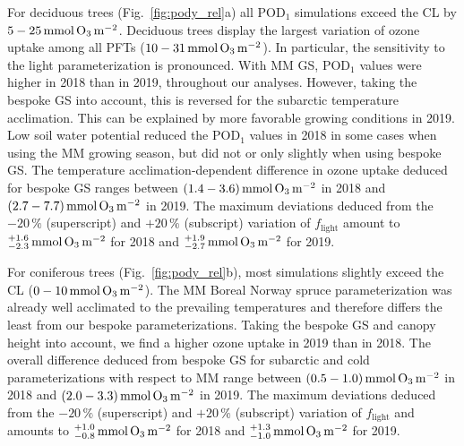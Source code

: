 \documentclass[bg, manuscript]{copernicus}
\begin{document}
For deciduous trees (Fig.~\ref{fig:pody_rel}a) all $\mathrm{POD_1}$ simulations exceed the CL by $5-25\,\unit{mmol\,\chem{O_3}\,m^{-2}}$. Deciduous trees display the largest variation of ozone uptake among all PFTs ($10-31\,\unit{mmol\,\chem{O_3}\,m^{-2}}$). In particular, the sensitivity to the light parameterization is pronounced. With MM GS, $\mathrm{POD_1}$ values were higher in 2018 than in 2019, throughout our analyses. However, taking the bespoke GS into account, this is reversed for the subarctic temperature acclimation. This can be explained by more favorable growing conditions in 2019. Low soil water potential reduced the $\mathrm{POD_1}$ values in 2018 in some cases when using the MM growing season, but did not or only slightly when using bespoke GS. The temperature acclimation-dependent difference in ozone uptake deduced for bespoke GS ranges between $(1.4-3.6)\,\unit{mmol\,\chem{O_3}\,m^{-2}}$ in 2018 and $(2.7-7.7)\,\unit{mmol\,\chem{O_3}\,m^{-2}}$ in 2019. The maximum deviations deduced from the $-20\,\unit{\%}$ (superscript) and $+20\,\unit{\%}$ (subscript) variation of $f_\mathrm{light}$ amount to $^{+1.6}_{-2.3}\,\unit{mmol\,\chem{O_3}\,m^{-2}}$ for 2018 and $^{+1.9}_{-2.7}\,\unit{mmol\,\chem{O_3}\,m^{-2}}$ for 2019. 

For coniferous trees (Fig.~\ref{fig:pody_rel}b), most simulations slightly exceed the CL ($0-10\,\unit{mmol\,\chem{O_3}\,m^{-2}}$). The MM Boreal Norway spruce parameterization was already well acclimated to the prevailing temperatures and therefore differs the least from our bespoke parameterizations. Taking the bespoke GS and canopy height into account, we find a higher ozone uptake in 2019 than in 2018. The overall difference deduced from bespoke GS for subarctic and cold parameterizations with respect to MM range between $(0.5-1.0)\,\unit{mmol\,\chem{O_3}\,m^{-2}}$ in 2018 and $(2.0-3.3)\,\unit{mmol\,\chem{O_3}\,m^{-2}}$ in 2019. The maximum deviations deduced from the $-20\,\unit{\%}$ (superscript) and $+20\,\unit{\%}$ (subscript) variation of $f_\mathrm{light}$ and amounts to $^{+1.0}_{-0.8}\,\unit{mmol\,\chem{O_3}\,m^{-2}}$ for 2018 and $^{+1.3}_{-1.0}\,\unit{mmol\,\chem{O_3}\,m^{-2}}$ for 2019.
\end{document}
